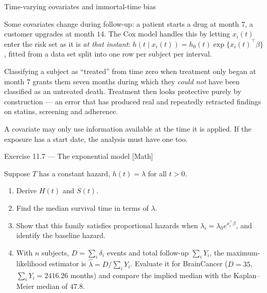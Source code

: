 \documentclass[aspectratio=169,11pt]{beamer}
\begin{document}
\begin{frame}{Time-varying covariates and immortal-time bias}
  \footnotesize
  \begin{readme}
    Some covariates change during follow-up: a patient starts a drug at month $7$, a
    customer upgrades at month $14$. The Cox model handles this by letting $x_i(t)$ enter
    the risk set as it is \emph{at that instant}:
    $h(t\mid x_i(t))=h_0(t)\exp\{x_i(t)^\top\beta\}$, fitted from a data set split into
    one row per subject per interval.
  \end{readme}
  \begin{mistake}
  \scriptsize
    Classifying a subject as ``treated'' from time zero when treatment only began at month
    $7$ grants them seven months during which they \emph{could not} have been classified as
    an untreated death. Treatment then looks protective purely by construction --- an
    error that has produced real and repeatedly retracted findings on statins, screening
    and adherence.
  \end{mistake}
  \begin{takeaway}
    A covariate may only use information available at the time it is applied. If the
    exposure has a start date, the analysis must have one too.
  \end{takeaway}
\end{frame}

\begin{frame}{Exercise 11.7 --- The exponential model [Math]}
\begin{exercise}
  Suppose $T$ has a constant hazard, $h(t)=\lambda$ for all $t>0$.
  \begin{enumerate}
    \item Derive $H(t)$ and $S(t)$.
    \item Find the median survival time in terms of $\lambda$.
    \item Show that this family satisfies proportional hazards when
          $\lambda_i=\lambda_0e^{x_i^\top\beta}$, and identify the baseline hazard.
    \item With $n$ subjects, $D=\sum_i\delta_i$ events and total follow-up
          $\sum_i Y_i$, the maximum-likelihood estimator is
          $\hat\lambda=D/\sum_i Y_i$. Evaluate it for BrainCancer ($D=35$,
          $\sum_i Y_i=2416.26$ months) and compare the implied median with the
          Kaplan--Meier median of $47.8$.
  \end{enumerate}
\end{exercise}
\end{frame}
\end{document}
